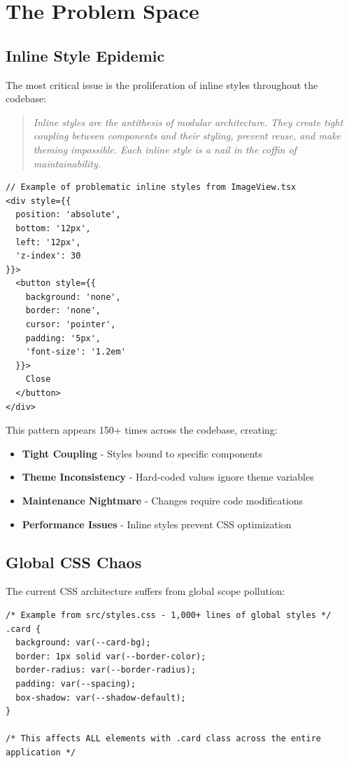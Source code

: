 \documentclass[11pt]{article}
\begin{document}
\section{The Problem Space}

\subsection{Inline Style Epidemic}

The most critical issue is the proliferation of inline styles throughout the codebase:

\begin{quote}
\emph{Inline styles are the antithesis of modular architecture. They create tight coupling between components and their styling, prevent reuse, and make theming impossible. Each inline style is a nail in the coffin of maintainability.}
\end{quote}

\begin{lstlisting}[style=typescript]
// Example of problematic inline styles from ImageView.tsx
<div style={{ 
  position: 'absolute', 
  bottom: '12px', 
  left: '12px', 
  'z-index': 30 
}}>
  <button style={{
    background: 'none',
    border: 'none',
    cursor: 'pointer',
    padding: '5px',
    'font-size': '1.2em'
  }}>
    Close
  </button>
</div>
\end{lstlisting}

This pattern appears 150+ times across the codebase, creating:
\begin{itemize}
\item \textbf{Tight Coupling} - Styles bound to specific components
\item \textbf{Theme Inconsistency} - Hard-coded values ignore theme variables
\item \textbf{Maintenance Nightmare} - Changes require code modifications
\item \textbf{Performance Issues} - Inline styles prevent CSS optimization
\end{itemize}

\subsection{Global CSS Chaos}

The current CSS architecture suffers from global scope pollution:

\begin{lstlisting}[style=css]
/* Example from src/styles.css - 1,000+ lines of global styles */
.card {
  background: var(--card-bg);
  border: 1px solid var(--border-color);
  border-radius: var(--border-radius);
  padding: var(--spacing);
  box-shadow: var(--shadow-default);
}

/* This affects ALL elements with .card class across the entire application */
\end{lstlisting}
\end{document}
